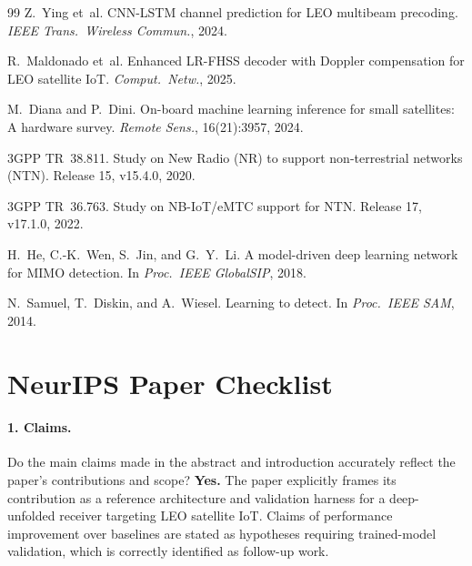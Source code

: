 \documentclass{article}
\begin{document}
{\begin{thebibliography}{99}
Z.~Ying et~al.
\newblock CNN-LSTM channel prediction for LEO multibeam precoding.
\newblock \emph{IEEE Trans.\ Wireless Commun.}, 2024.

R.~Maldonado et~al.
\newblock Enhanced LR-FHSS decoder with Doppler compensation for LEO satellite IoT.
\newblock \emph{Comput.\ Netw.}, 2025.

M.~Diana and P.~Dini.
\newblock On-board machine learning inference for small satellites: A hardware survey.
\newblock \emph{Remote Sens.}, 16(21):3957, 2024.

3GPP TR~38.811.
\newblock Study on New Radio (NR) to support non-terrestrial networks (NTN).
\newblock Release 15, v15.4.0, 2020.

3GPP TR~36.763.
\newblock Study on NB-IoT/eMTC support for NTN.
\newblock Release 17, v17.1.0, 2022.

H.~He, C.-K.~Wen, S.~Jin, and G.~Y.~Li.
\newblock A model-driven deep learning network for MIMO detection.
\newblock In \emph{Proc.\ IEEE GlobalSIP}, 2018.

N.~Samuel, T.~Diskin, and A.~Wiesel.
\newblock Learning to detect.
\newblock In \emph{Proc.\ IEEE SAM}, 2014.

\end{thebibliography}
}

\appendix
\section{NeurIPS Paper Checklist}

\paragraph{1. Claims.}
Do the main claims made in the abstract and introduction accurately reflect the paper's contributions and scope?
\textbf{Yes.} The paper explicitly frames its contribution as a reference architecture and validation harness for a deep-unfolded receiver targeting LEO satellite IoT. Claims of performance improvement over baselines are stated as hypotheses requiring trained-model validation, which is correctly identified as follow-up work.
\end{document}
